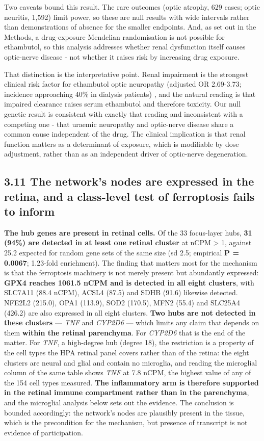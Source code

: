 \documentclass[utf8]{FrontiersinVancouver}
\begin{document}
Two caveats bound this result. The rare outcomes (optic atrophy, 629 cases; optic neuritis, 1,592) limit power, so these are null results with wide intervals rather than demonstrations of absence for the smaller endpoints. And, as set out in the Methods, a drug-exposure Mendelian randomisation is not possible for ethambutol, so this analysis addresses whether renal dysfunction itself causes optic-nerve disease - not whether it raises risk by increasing drug exposure.

That distinction is the interpretative point. Renal impairment is the strongest clinical risk factor for ethambutol optic neuropathy (adjusted OR 2.69-3.73; incidence approaching 40\% in dialysis patients) \citep{hy2012,v2019}, and the natural reading is that impaired clearance raises serum ethambutol and therefore toxicity. Our null genetic result is consistent with exactly that reading and inconsistent with a competing one - that uraemic neuropathy and optic-nerve disease share a common cause independent of the drug. The clinical implication is that renal function matters as a determinant of exposure, which is modifiable by dose adjustment, rather than as an independent driver of optic-nerve degeneration.

\subsection{3.11 The network's nodes are expressed in the retina, and a class-level test of ferroptosis fails to inform}

\textbf{The hub genes are present in retinal cells.} Of the 33 focus-layer hubs, \textbf{31 (94\%) are detected in at least one retinal cluster} at nCPM > 1, against 25.2 expected for random gene sets of the same size (sd 2.5; empirical \textbf{P = 0.0067}; 1.23-fold enrichment). The finding that matters most for the mechanism is that the ferroptosis machinery is not merely present but abundantly expressed: \textbf{GPX4 reaches 1061.5 nCPM and is detected in all eight clusters}, with SLC7A11 (88.4 nCPM), ACSL4 (87.5) and SDHB (91.6) likewise detected. NFE2L2 (215.0), OPA1 (113.9), SOD2 (170.5), MFN2 (55.4) and SLC25A4 (426.2) are also expressed in all eight clusters. \textbf{Two hubs are not detected in these clusters} --- \textit{TNF} and \textit{CYP2D6} --- which limits any claim that depends on them \textbf{within the retinal parenchyma}. For \textit{CYP2D6} that is the end of the matter. For \textit{TNF}, a high-degree hub (degree 18), the restriction is a property of the cell types the HPA retinal panel covers rather than of the retina: the eight clusters are neural and glial and contain no microglia, and reading the microglial column of the same table shows \textit{TNF} at 7.8 nCPM, the highest value of any of the 154 cell types measured. \textbf{The inflammatory arm is therefore supported in the retinal immune compartment rather than in the parenchyma}, and the microglial analysis below sets out the evidence. The conclusion is bounded accordingly: the network's nodes are plausibly present in the tissue, which is the precondition for the mechanism, but presence of transcript is not evidence of participation.
\end{document}
